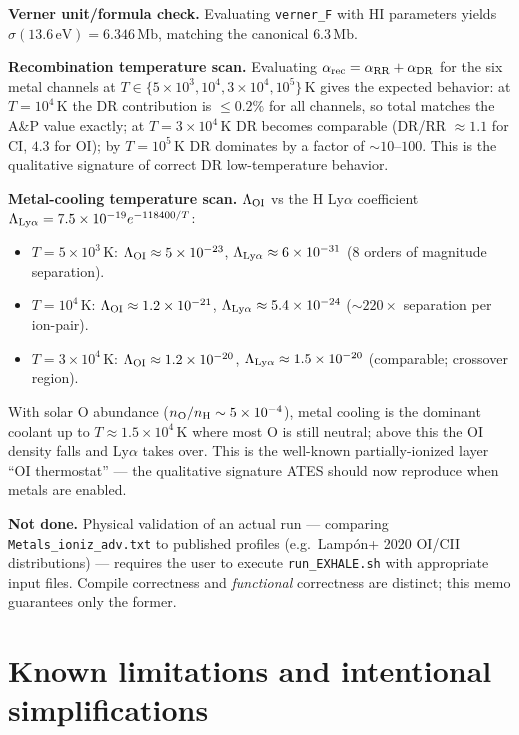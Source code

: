 \documentclass[english,a4paper]{my_memo}
\begin{document}
\textbf{Verner unit/formula check.} Evaluating \texttt{verner\_F} with HI
parameters yields $\sigma(13.6\,\mathrm{eV}) = 6.346\,\mathrm{Mb}$, matching
the canonical $6.3\,\mathrm{Mb}$.

\textbf{Recombination temperature scan.} Evaluating
$\alpha_{\rm rec} = \alpha_{\rm RR} + \alpha_{\rm DR}$ for the six
metal channels at $T \in \{5\times 10^3, 10^4, 3\times 10^4, 10^5\}\,$K
gives the expected behavior: at $T = 10^4\,$K the DR contribution is
${\le}0.2\%$ for all channels, so total matches the A\&P value
exactly; at $T = 3\times 10^4\,$K DR becomes comparable
(DR/RR $\approx 1.1$ for CI, $4.3$ for OI); by $T = 10^5\,$K DR
dominates by a factor of $\sim 10$--$100$. This is the qualitative
signature of correct DR low-temperature behavior.

\textbf{Metal-cooling temperature scan.} $\Lambda_{\rm OI}$ vs the
H Ly$\alpha$ coefficient $\Lambda_{\rm Ly\alpha} = 7.5\times 10^{-19}
e^{-118400/T}$:
\begin{itemize}\itemsep 0pt
\item $T = 5\times 10^3\,$K: $\Lambda_{\rm OI} \approx 5\times 10^{-23}$,
$\Lambda_{\rm Ly\alpha} \approx 6\times 10^{-31}$ (8 orders of magnitude separation).
\item $T = 10^4\,$K: $\Lambda_{\rm OI} \approx 1.2 \times 10^{-21}$,
$\Lambda_{\rm Ly\alpha} \approx 5.4 \times 10^{-24}$
($\sim 220 \times$ separation per ion-pair).
\item $T = 3 \times 10^4\,$K: $\Lambda_{\rm OI} \approx 1.2 \times 10^{-20}$,
$\Lambda_{\rm Ly\alpha} \approx 1.5\times 10^{-20}$ (comparable;
crossover region).
\end{itemize}
With solar O abundance ($n_{\rm O}/n_{\rm H} \sim 5 \times 10^{-4}$),
metal cooling is the dominant coolant up to $T \approx 1.5 \times 10^4\,$K
where most O is still neutral; above this the OI density falls and
Ly$\alpha$ takes over. This is the well-known partially-ionized layer
``OI thermostat'' --- the qualitative signature ATES should now
reproduce when metals are enabled.

\textbf{Not done.} Physical validation of an actual run --- comparing
\texttt{Metals\_ioniz\_adv.txt} to published profiles (e.g.\ Lampón+ 2020
OI/CII distributions) --- requires the user to execute
\texttt{run\_EXHALE.sh} with appropriate input files. Compile correctness
and \emph{functional} correctness are distinct; this memo guarantees only
the former.

\section{Known limitations and intentional simplifications}
\end{document}
